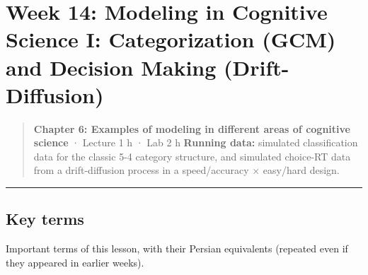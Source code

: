 \section{Week 14: Modeling in Cognitive Science I: Categorization (GCM)
and Decision Making (Drift-Diffusion)}

\begin{quote}
\textbf{Chapter 6: Examples of modeling in different areas of cognitive
science} · Lecture 1 h · Lab 2 h \textbf{Running data:} simulated
classification data for the classic 5-4 category structure, and
simulated choice-RT data from a drift-diffusion process in a
speed/accuracy × easy/hard design.
\end{quote}

\begin{center}\rule{0.5\linewidth}{0.5pt}\end{center}

\subsection{Key terms}

Important terms of this lesson, with their Persian equivalents (repeated
even if they appeared in earlier weeks).

